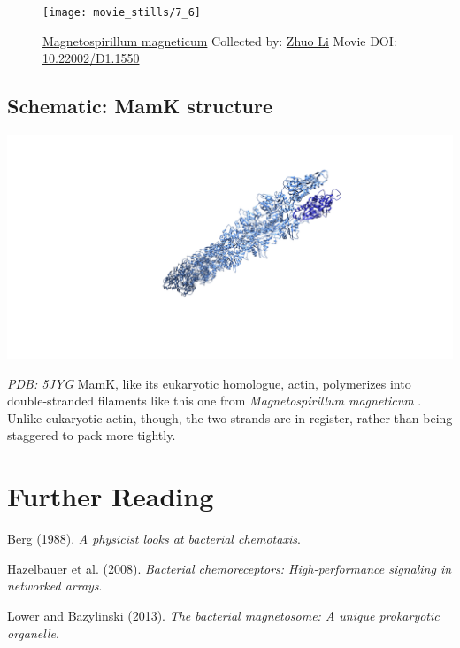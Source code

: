 \documentclass[]{tufte-book}
\begin{document}
\begin{figure}
\texttt{[image: movie\_stills/7\_6]} \caption[\protect\hyperlink{tree}{Magnetospirillum magneticum}
Collected by: \protect\hyperlink{zhuo_li}{Zhuo Li} Movie DOI:
\href{https://doi.org/10.22002/D1.1550}{10.22002/D1.1550}]{\protect\hyperlink{tree}{Magnetospirillum magneticum}
Collected by: \protect\hyperlink{zhuo_li}{Zhuo Li} Movie DOI:
\href{https://doi.org/10.22002/D1.1550}{10.22002/D1.1550}}\label{fig:7-6}
\end{figure}

\hypertarget{MamK_structure}{\subsection*{Schematic: MamK
structure}\label{MamK_structure}}

\includegraphics{img/schematics/7_6_1}

\emph{PDB: 5JYG} MamK, like its eukaryotic homologue, actin, polymerizes
into double-stranded filaments like this one from \emph{Magnetospirillum
magneticum} \citep{bergeron2017}. Unlike eukaryotic actin, though, the
two strands are in register, rather than being staggered to pack more
tightly.

\section{Further Reading}\label{further-reading}

Berg (1988). \emph{A physicist looks at bacterial
chemotaxis}.\citep{berg1988}

Hazelbauer et al. (2008). \emph{Bacterial chemoreceptors:
High-performance signaling in networked arrays}.\citep{hazelbauer2008}

Lower and Bazylinski (2013). \emph{The bacterial magnetosome: A unique
prokaryotic organelle}.\citep{lower2013}
\end{document}
